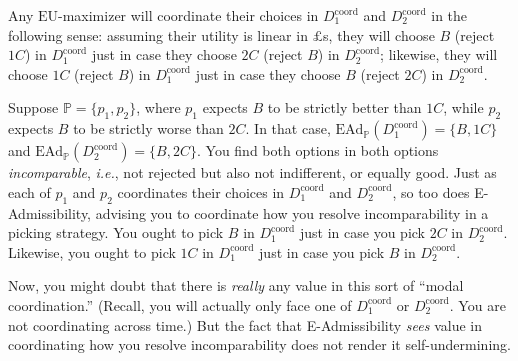 \documentclass[a4paper,final]{article}
\renewcommand\P{\mathbb{P}} %
\newcommand\EU{\mathrm{EU}}
\newcommand\EAd{\mathrm{EAd}}
\newcommand\U{\mathfrak{U}} %
\newcommand{\D}{\mathcal{D}}
\newcommand\s{\mathsf{s}}
\newcommand{\IP}{\P}
\newcommand{\todoold}[2][]{\todo[backgroundcolor=white,bordercolor=orange!10,linecolor=gray!10, #1,caption={},textcolor=gray]{Pre-rev: #2}}
\newenvironment{CCM rewritten}
{\begingroup\color{blue}} %
{\endgroup}              %
\begin{document}
	Any $\EU$-maximizer will coordinate their choices in $D^{\mathrm{coord}}_1$ and $D^{\mathrm{coord}}_2$ in the following sense: assuming their utility is linear in $\pounds$s, they will choose $B$ (reject $1C$) in $D^{\mathrm{coord}}_1$ just in case they choose $2C$ (reject $B$) in $D^{\mathrm{coord}}_2$; likewise, they will choose $1C$ (reject $B$) in $D^{\mathrm{coord}}_1$ just in case they choose $B$ (reject $2C$) in $D^{\mathrm{coord}}_2$. 
	
	Suppose $\IP = \{p_1, p_2\}$, where $p_1$ expects $B$ to be strictly better than $1C$, while $p_2$ expects $B$ to be strictly worse than $2C$. In that case, $\EAd_\IP(D^{\mathrm{coord}}_1)=\{B,1C\}$ and $\EAd_\IP(D^{\mathrm{coord}}_2)=\{B,2C\}$. You find both options in both options \emph{incomparable}, \emph{i.e.}, not rejected but also not indifferent, or equally good. Just as each of $p_1$ and $p_2$ coordinates their choices in $D^{\mathrm{coord}}_1$ and $D^{\mathrm{coord}}_2$, so too does E-Admissibility, advising you to coordinate how you resolve incomparability in a picking strategy. You ought to pick $B$ in $D^{\mathrm{coord}}_1$ just in case you pick $2C$ in $D^{\mathrm{coord}}_2$. Likewise, you ought to pick $1C$ in $D^{\mathrm{coord}}_1$ just in case you pick $B$ in $D^{\mathrm{coord}}_2$. 

	
	
	Now, you might doubt that there is \emph{really} any value in this sort of ``modal coordination.'' (Recall, you will actually only face one of $D^{\mathrm{coord}}_1$ or $D^{\mathrm{coord}}_2$. You are not coordinating across time.) But the fact that E-Admissibility \emph{sees} value in coordinating how you resolve incomparability does not render it self-undermining.
	
\end{document}
